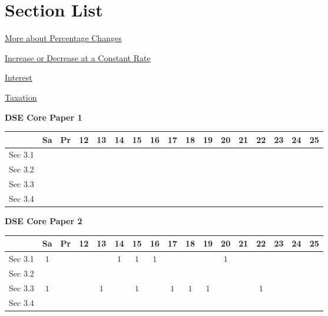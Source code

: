 \documentclass[12pt, a4paper]{article}
\begin{document}
\section*{Section List}
\begin{enumx}[label=Sec 3.\arabic*\ ]
\item \hyperref[section:3-3-1]{More about Percentage Changes}
\item \hyperref[section:3-3-2]{Increase or Decrease at a Constant Rate}
\item \hyperref[section:3-3-3]{Interest}
\item \hyperref[section:3-3-4]{Taxation }
\end{enumx}
\begin{absolutelynopagebreak}
\begin{center}
\textbf{DSE Core Paper 1}
\end{center}
\begin{center}
\begin{tabular}{|l|c|c|c|c|c|c|c|c|c|c|c|c|c|c|c|c|}
\hline
        & Sa & Pr & 12 & 13 & 14 & 15 & 16 & 17 & 18 & 19 & 20 & 21 & 22 & 23 & 24 & 25 \\\hline\hline
Sec 3.1 &  &  &  &  &  &  &  &  &  &  &  &  &  &  &  &  \\\hline
Sec 3.2 &  &  &  &  &  &  &  &  &  &  &  &  &  &  &  &  \\\hline
Sec 3.3 &  &  &  &  &  &  &  &  &  &  &  &  &  &  &  &  \\\hline
Sec 3.4 &  &  &  &  &  &  &  &  &  &  &  &  &  &  &  &  \\\hline
\end{tabular}
\end{center}
\end{absolutelynopagebreak}
\begin{absolutelynopagebreak}
\begin{center}
\textbf{DSE Core Paper 2}
\end{center}
\begin{center}
\begin{tabular}{|l|c|c|c|c|c|c|c|c|c|c|c|c|c|c|c|c|}
\hline
        & Sa & Pr & 12 & 13 & 14 & 15 & 16 & 17 & 18 & 19 & 20 & 21 & 22 & 23 & 24 & 25 \\\hline\hline
Sec 3.1 &  $1$ &  &  &  &  $1$ &  $1$ &  $1$ &  &  &  &  $1$ &  &  &  &  &  \\\hline
Sec 3.2 &  &  &  &  &  &  &  &  &  &  &  &  &  &  &  &  \\\hline
Sec 3.3 &  $1$ &  &  &  $1$ &  &  $1$ &  &  $1$ &  $1$ &  $1$ &  &  &  $1$ &  &  &  \\\hline
Sec 3.4 &  &  &  &  &  &  &  &  &  &  &  &  &  &  &  &  \\\hline
\end{tabular}
\end{center}
\end{absolutelynopagebreak}
\end{document}
